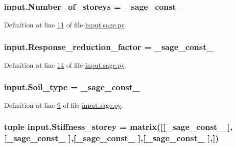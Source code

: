 \subsubsection[{Number\+\_\+of\+\_\+storeys}]{\setlength{\rightskip}{0pt plus 5cm}input.\+Number\+\_\+of\+\_\+storeys = \+\_\+sage\+\_\+const\+\_}\label{namespaceinput_a10237b312ba44e8c8090db86059c5803}


Definition at line \hyperlink{input_8sage_8py_source_l00011}{11} of file \hyperlink{input_8sage_8py_source}{input.\+sage.\+py}.

\hypertarget{namespaceinput_aa6d0078a6d934c0d515d85059525e938}{}
\subsubsection[{Response\+\_\+reduction\+\_\+factor}]{\setlength{\rightskip}{0pt plus 5cm}input.\+Response\+\_\+reduction\+\_\+factor = \+\_\+sage\+\_\+const\+\_}\label{namespaceinput_aa6d0078a6d934c0d515d85059525e938}


Definition at line \hyperlink{input_8sage_8py_source_l00014}{14} of file \hyperlink{input_8sage_8py_source}{input.\+sage.\+py}.

\hypertarget{namespaceinput_a6221ae01cf2fb9e8cd22204749785a0e}{}
\subsubsection[{Soil\+\_\+type}]{\setlength{\rightskip}{0pt plus 5cm}input.\+Soil\+\_\+type = \+\_\+sage\+\_\+const\+\_}\label{namespaceinput_a6221ae01cf2fb9e8cd22204749785a0e}


Definition at line \hyperlink{input_8sage_8py_source_l00009}{9} of file \hyperlink{input_8sage_8py_source}{input.\+sage.\+py}.

\hypertarget{namespaceinput_a3853184afbe677b2a218690766c4f5e4}{}
\subsubsection[{Stiffness\+\_\+storey}]{\setlength{\rightskip}{0pt plus 5cm}tuple input.\+Stiffness\+\_\+storey = matrix(\mbox{[}\mbox{[}\+\_\+sage\+\_\+const\+\_ \mbox{]},\mbox{[}\+\_\+sage\+\_\+const\+\_ \mbox{]},\mbox{[}\+\_\+sage\+\_\+const\+\_ \mbox{]},\mbox{[}\+\_\+sage\+\_\+const\+\_ \mbox{]},\mbox{]})}\label{namespaceinput_a3853184afbe677b2a218690766c4f5e4}


